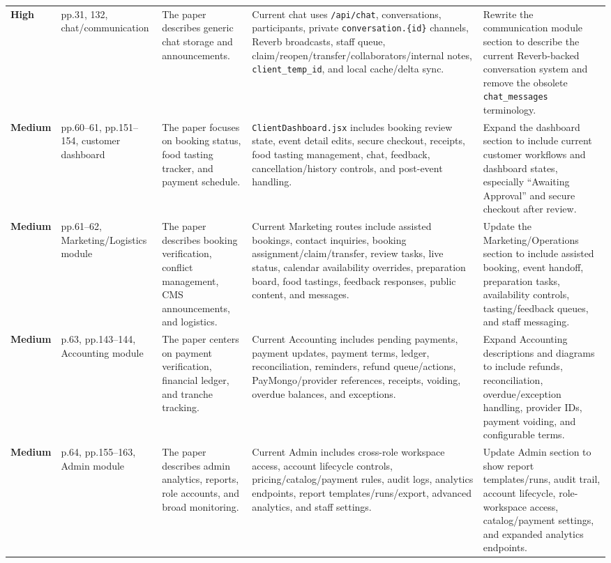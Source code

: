 \documentclass[11pt]{article}
\newcommand{\severityhigh}{\textcolor{high}{\textbf{High}}}
\newcommand{\severitymedium}{\textcolor{medium}{\textbf{Medium}}}
\begin{document}
\begin{landscape}
\begin{longtable}{L{0.72in} L{1.05in} L{2.05in} L{2.55in} L{2.55in}}
\severityhigh & pp.31, 132, chat/communication & The paper describes generic chat storage and announcements. & Current chat uses \texttt{/api/chat}, conversations, participants, private \texttt{conversation.\{id\}} channels, Reverb broadcasts, staff queue, claim/reopen/transfer/collaborators/internal notes, \texttt{client\_temp\_id}, and local cache/delta sync. & Rewrite the communication module section to describe the current Reverb-backed conversation system and remove the obsolete \texttt{chat\_messages} terminology. \\

\severitymedium & pp.60--61, pp.151--154, customer dashboard & The paper focuses on booking status, food tasting tracker, and payment schedule. & \texttt{ClientDashboard.jsx} includes booking review state, event detail edits, secure checkout, receipts, food tasting management, chat, feedback, cancellation/history controls, and post-event handling. & Expand the dashboard section to include current customer workflows and dashboard states, especially ``Awaiting Approval'' and secure checkout after review. \\

\severitymedium & pp.61--62, Marketing/Logistics module & The paper describes booking verification, conflict management, CMS announcements, and logistics. & Current Marketing routes include assisted bookings, contact inquiries, booking assignment/claim/transfer, review tasks, live status, calendar availability overrides, preparation board, food tastings, feedback responses, public content, and messages. & Update the Marketing/Operations section to include assisted booking, event handoff, preparation tasks, availability controls, tasting/feedback queues, and staff messaging. \\

\severitymedium & p.63, pp.143--144, Accounting module & The paper centers on payment verification, financial ledger, and tranche tracking. & Current Accounting includes pending payments, payment updates, payment terms, ledger, reconciliation, reminders, refund queue/actions, PayMongo/provider references, receipts, voiding, overdue balances, and exceptions. & Expand Accounting descriptions and diagrams to include refunds, reconciliation, overdue/exception handling, provider IDs, payment voiding, and configurable terms. \\

\severitymedium & p.64, pp.155--163, Admin module & The paper describes admin analytics, reports, role accounts, and broad monitoring. & Current Admin includes cross-role workspace access, account lifecycle controls, pricing/catalog/payment rules, audit logs, analytics endpoints, report templates/runs/export, advanced analytics, and staff settings. & Update Admin section to show report templates/runs, audit trail, account lifecycle, role-workspace access, catalog/payment settings, and expanded analytics endpoints. \\


\end{longtable}
\end{landscape}
\end{document}
